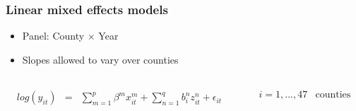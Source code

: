 \documentclass{beamer}              %
\begin{document}




\begin{frame}
\frametitle{Linear mixed effects models}\label{Methods} 

\begin{itemize}
\item Panel: County $\times$ Year
\item Slopes allowed to vary over counties
\end{itemize}


\begin{columns}

\begin{column}{0.5\textwidth} 
\begingroup
\everymath{\Large}
\begin{align*}
\begin{array}{lcl}
 log(y_{\scriptscriptstyle it} )&=&\sum_{\scriptscriptstyle m=1}^{\scriptscriptstyle p} \beta^{\scriptscriptstyle m}x^{\scriptscriptstyle m}_{\scriptscriptstyle it}+ \sum_{\scriptscriptstyle n=1}^{\scriptscriptstyle q}b^{\scriptscriptstyle n}_{\scriptscriptstyle i}z^{\scriptscriptstyle n}_{\scriptscriptstyle it}+\epsilon_{\scriptscriptstyle it}
\end{array}
\end{align*}
\endgroup
\end{column}

\begin{column}{0.5\textwidth} 
\begingroup
\everymath{\footnotesize}
\begin{align*}
\begin{array}{ll}
i=1,...,47 & \text{counties}
\end{array}
\end{align*}
\endgroup
\end{column}
\end{columns}

\begin{table}
\begin{small}
\begin{tabular}{lll}


\end{tabular}
\end{small}
\end{table}
\end{frame}
\end{document}
